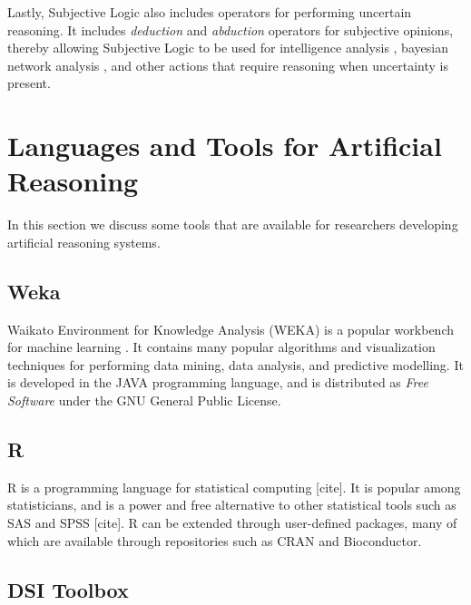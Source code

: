 \documentclass[thesis.tex]{subfiles}
\begin{document}
Lastly, Subjective Logic also includes operators for performing uncertain reasoning. It includes
\emph{deduction} and \emph{abduction} operators for subjective opinions, thereby allowing Subjective
Logic to be used for intelligence analysis \cite{pope2005analysis},
bayesian network analysis \cite{josang2008conditional}, and other actions that
require reasoning when uncertainty is present.




\section{Languages and Tools for Artificial Reasoning}






In this section we discuss some tools that are available for researchers developing
artificial reasoning systems.

\subsection{Weka}

Waikato Environment for Knowledge Analysis (WEKA) is a popular workbench for machine learning
\cite{witten2005data}. It contains many popular algorithms and visualization techniques for performing data mining,
data analysis, and predictive modelling. It is developed in the JAVA programming language, and is
distributed as \emph{Free Software} under the GNU General Public License.

%
%

\subsection{R}

R is a programming language for statistical computing [cite]. It is popular among statisticians, and
is a power and free alternative to other statistical tools such as SAS and SPSS [cite]. R can be extended through
user-defined packages, many of which are available through repositories such as CRAN and Bioconductor.

%
%

\subsection{DSI Toolbox}
\end{document}
